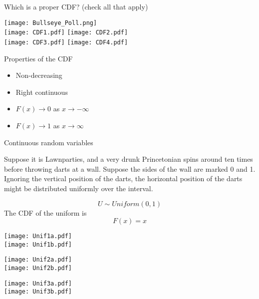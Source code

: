 \documentclass{beamer}
\begin{document}
\begin{frame}{Which is a proper CDF? (check all that apply)}
\begin{center}
\texttt{[image: Bullseye\_Poll.png]} \\
\texttt{[image: CDF1.pdf]}
\texttt{[image: CDF2.pdf]} \\
\texttt{[image: CDF3.pdf]}
\texttt{[image: CDF4.pdf]}
\end{center}
\end{frame}

\begin{frame}{Properties of the CDF}
\begin{itemize}
\item Non-decreasing
\item Right continuous
\item $F(x)\rightarrow 0$ as $x\rightarrow -\infty$
\item $F(x)\rightarrow 1$ as $x\rightarrow \infty$
\end{itemize}
\end{frame}

\begin{frame}{Continuous random variables}

Suppose it is Lawnparties, and a very drunk Princetonian spins around ten times before throwing darts at a wall. Suppose the sides of the wall are marked 0 and 1. Ignoring the vertical position of the darts, the horizontal position of the darts might be distributed \alert{uniformly} over the interval.

$$U\sim Uniform(0,1)$$
The CDF of the uniform is
$$F(x)=x$$
\end{frame}

\begin{frame}
\centering
\texttt{[image: Unif1a.pdf]} \\
\texttt{[image: Unif1b.pdf]}
\end{frame}

\begin{frame}
\centering
\texttt{[image: Unif2a.pdf]} \\
\texttt{[image: Unif2b.pdf]}
\end{frame}

\begin{frame}
\centering
\texttt{[image: Unif3a.pdf]} \\
\texttt{[image: Unif3b.pdf]}
\end{frame}
\end{document}
